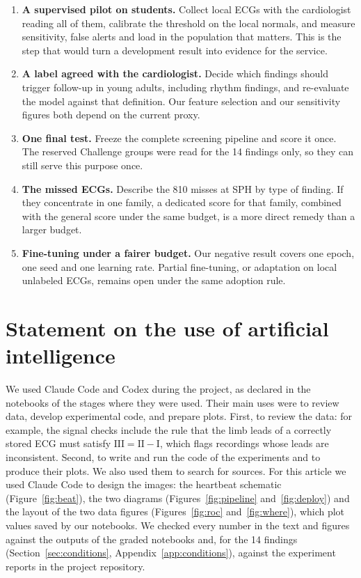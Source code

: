 \documentclass[letterpaper,11pt]{article}
\begin{document}
\begin{enumerate}\setlength{\itemsep}{0pt}\setlength{\parskip}{0pt}
  \item \textbf{A supervised pilot on students.} Collect local ECGs with the cardiologist reading all of them, calibrate the threshold on the local normals, and measure sensitivity, false alerts and load in the population that matters. This is the step that would turn a development result into evidence for the service.
  \item \textbf{A label agreed with the cardiologist.} Decide which findings should trigger follow-up in young adults, including rhythm findings, and re-evaluate the model against that definition. Our feature selection and our sensitivity figures both depend on the current proxy.
  \item \textbf{One final test.} Freeze the complete screening pipeline and score it once. The reserved Challenge groups were read for the 14 findings only, so they can still serve this purpose once.
  \item \textbf{The missed ECGs.} Describe the 810 misses at SPH by type of finding. If they concentrate in one family, a dedicated score for that family, combined with the general score under the same budget, is a more direct remedy than a larger budget.
  \item \textbf{Fine-tuning under a fairer budget.} Our negative result covers one epoch, one seed and one learning rate. Partial fine-tuning, or adaptation on local unlabeled ECGs, remains open under the same adoption rule.
\end{enumerate}

\section*{Statement on the use of artificial intelligence}
We used Claude Code \parencite{anthropic2026claude} and Codex \parencite{openai2026codex} during the project, as declared in the notebooks of the stages where they were used. Their main uses were to review data, develop experimental code, and prepare plots. First, to review the data: for example, the signal checks include the rule that the limb leads of a correctly stored ECG must satisfy $\text{III} = \text{II} - \text{I}$, which flags recordings whose leads are inconsistent. Second, to write and run the code of the experiments and to produce their plots. We also used them to search for sources. For this article we used Claude Code to design the images: the heartbeat schematic (Figure~\ref{fig:beat}), the two diagrams (Figures~\ref{fig:pipeline} and~\ref{fig:deploy}) and the layout of the two data figures (Figures~\ref{fig:roc} and~\ref{fig:where}), which plot values saved by our notebooks. We checked every number in the text and figures against the outputs of the graded notebooks and, for the 14 findings (Section~\ref{sec:conditions}, Appendix~\ref{app:conditions}), against the experiment reports in the project repository.
\end{document}

